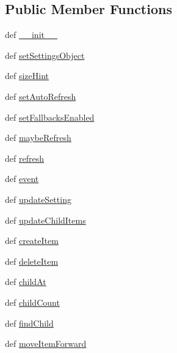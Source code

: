 \subsection*{Public Member Functions}
\begin{DoxyCompactItemize}
\item 
def \hyperlink{classsettingseditor_1_1SettingsTree_a9f95c5c3554f56ee5bdde6052b7ffdfd}{\+\_\+\+\_\+init\+\_\+\+\_\+}
\item 
def \hyperlink{classsettingseditor_1_1SettingsTree_a0c77b6d88e569ccfb38715f58d33ffeb}{set\+Settings\+Object}
\item 
def \hyperlink{classsettingseditor_1_1SettingsTree_ad13c555849ec21834f5c73860a818a3a}{size\+Hint}
\item 
def \hyperlink{classsettingseditor_1_1SettingsTree_abb32b603e3f0180c6b4b9d09069b084e}{set\+Auto\+Refresh}
\item 
def \hyperlink{classsettingseditor_1_1SettingsTree_ad8c74064d33c35b991b7c08c6d71feee}{set\+Fallbacks\+Enabled}
\item 
def \hyperlink{classsettingseditor_1_1SettingsTree_a789c1d5c9a62ccb412d80bb4885f6037}{maybe\+Refresh}
\item 
def \hyperlink{classsettingseditor_1_1SettingsTree_ab989e0da4e0661f114d5101e4a5f0bba}{refresh}
\item 
def \hyperlink{classsettingseditor_1_1SettingsTree_a424e603f24439f6153fd3bfe302d932a}{event}
\item 
def \hyperlink{classsettingseditor_1_1SettingsTree_a1399bab4ae8a7d3c06ff4a9e0ceffb73}{update\+Setting}
\item 
def \hyperlink{classsettingseditor_1_1SettingsTree_a83f7d23cb580e7bdb70abafa417dc110}{update\+Child\+Items}
\item 
def \hyperlink{classsettingseditor_1_1SettingsTree_aaecf2070b8bbc99b7c6a9fc78c93577f}{create\+Item}
\item 
def \hyperlink{classsettingseditor_1_1SettingsTree_a7a8f8138f921d81b59766ce1c4a8770f}{delete\+Item}
\item 
def \hyperlink{classsettingseditor_1_1SettingsTree_a884392d1cba3ffde67787a7de31a6f21}{child\+At}
\item 
def \hyperlink{classsettingseditor_1_1SettingsTree_a38c60fdf1359352fc13ba1b480a5f6f0}{child\+Count}
\item 
def \hyperlink{classsettingseditor_1_1SettingsTree_a37d2414820aaeee1e2b4ad239cd858d0}{find\+Child}
\item 
def \hyperlink{classsettingseditor_1_1SettingsTree_ae528d295dbced2a7ffbcca122aa8c7fb}{move\+Item\+Forward}
\end{DoxyCompactItemize}
